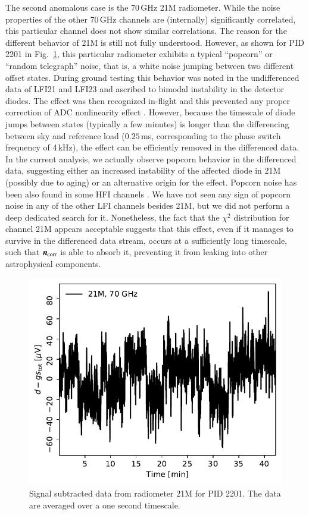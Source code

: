 \documentclass{aa}
\newcommand{\n}[0]{\vec{n}}
\begin{document}
The second anomalous case is the 70\,GHz 21M radiometer.  While the
noise properties of the other 70\,GHz channels are (internally)
significantly correlated, this particular channel does not show
similar correlations. The reason for the different behavior of 21M is
still not fully understood. However, as shown for PID 2201 in
Fig.~\ref{fig:popcorn_21M}, this particular radiometer exhibits a
typical “popcorn” or “random telegraph” noise, that is, a white noise
jumping between two different offset states.  During ground testing
this behavior was noted in the undifferenced data of LFI21 and LFI23
and ascribed to bimodal instability in the detector diodes. The effect
was then recognized in-flight and this prevented any proper correction of
ADC nonlinearity effect \citep{planck2013-p02a}. However, because the
timescale of diode jumps between states (typically a few minutes) is
longer than the differencing between sky and reference load
($0.25$\,ms, corresponding to the phase switch frequency of 4\,kHz),
the effect can be efficiently removed in the differenced data. In the
current analysis, we actually observe popcorn behavior in the
differenced data, suggesting either an increased instability of the
affected diode in 21M (possibly due to aging) or an alternative origin
for the effect.  Popcorn noise has been also found in some HFI channels
\citep{planck2011-1.5}. We have not seen any sign of popcorn noise in
any of the other LFI channels besides 21M, but we did not 
perform a deep dedicated search for it. Nonetheless, the fact that the
$\chi^2$ distribution for channel 21M appears acceptable suggests that
this effect, even if it manages to survive in the differenced data stream, occurs
at a sufficiently long timescale, such that $\n_{\rm corr}$ is able to
absorb it, preventing it from leaking into other astrophysical
components.
\begin{figure}
        \begin{center}
                \includegraphics[width=\linewidth]{figs/popcorn_2201.pdf}
        \end{center}
        \caption{Signal subtracted data from radiometer 21M for PID 2201. The data are averaged over a one second timescale. 
                \label{fig:popcorn_21M}}
\end{figure}
\end{document}
